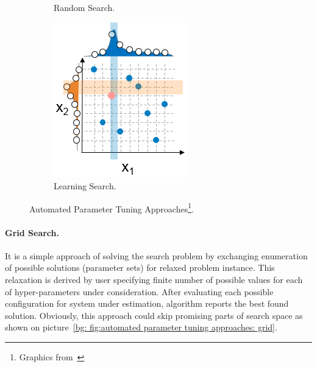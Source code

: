 \begin{figure}
\begin{subfigure}[b]{0.25\linewidth}
		\caption{Random Search.}
		\label{bg: fig:automated parameter tuning approaches: random}
	\end{subfigure}
	\begin{subfigure}[b]{0.25\linewidth}
		\includegraphics[width=\linewidth]{graphics/Background/hyperparameter-learning-search.png}
		\caption{Learning Search.}
		\label{bg: fig:automated parameter tuning approaches: learning}
	\end{subfigure}
	\caption{Automated Parameter Tuning Approaches\protect\footnote{Graphics from~\cite{koch2017automated}}.}
	\label{bg: fig:automated parameter tuning approaches}
\end{figure}


\paragraph{Grid Search.} It is a simple approach of solving the search problem by exchanging enumeration of possible solutions (parameter sets) for relaxed problem instance. This relaxation is derived by user specifying finite number of possible values for each of hyper-parameters under consideration. After evaluating each possible configuration for system under estimation, algorithm reports the best found solution. Obviously, this approach could skip promising parts of search space as shown on picture~\ref{bg: fig:automated parameter tuning approaches: grid}.


